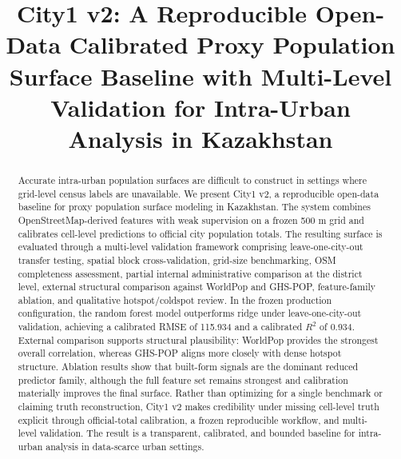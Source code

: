 \documentclass[11pt]{article}
\title{City1 v2: A Reproducible Open-Data Calibrated Proxy Population Surface Baseline with Multi-Level Validation for Intra-Urban Analysis in Kazakhstan}
\author{}
\date{}
\begin{document}
\maketitle

\begin{abstract}
Accurate intra-urban population surfaces are difficult to construct in settings where grid-level census labels are unavailable. We present City1 v2, a reproducible open-data baseline for proxy population surface modeling in Kazakhstan. The system combines OpenStreetMap-derived features with weak supervision on a frozen 500 m grid and calibrates cell-level predictions to official city population totals. The resulting surface is evaluated through a multi-level validation framework comprising leave-one-city-out transfer testing, spatial block cross-validation, grid-size benchmarking, OSM completeness assessment, partial internal administrative comparison at the district level, external structural comparison against WorldPop and GHS-POP, feature-family ablation, and qualitative hotspot/coldspot review. In the frozen production configuration, the random forest model outperforms ridge under leave-one-city-out validation, achieving a calibrated RMSE of 115.934 and a calibrated $R^2$ of 0.934. External comparison supports structural plausibility: WorldPop provides the strongest overall correlation, whereas GHS-POP aligns more closely with dense hotspot structure. Ablation results show that built-form signals are the dominant reduced predictor family, although the full feature set remains strongest and calibration materially improves the final surface. Rather than optimizing for a single benchmark or claiming truth reconstruction, City1 v2 makes credibility under missing cell-level truth explicit through official-total calibration, a frozen reproducible workflow, and multi-level validation. The result is a transparent, calibrated, and bounded baseline for intra-urban analysis in data-scarce urban settings.
\end{abstract}













\end{document}
